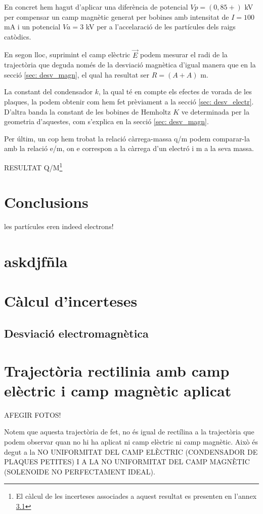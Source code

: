 \documentclass[11pt]{article}
\begin{document}
En concret hem hagut d'aplicar una diferència de potencial $Vp = (0,85 + )$ kV per compensar un camp magnètic generat per bobines amb intensitat de $I = 100$ mA i un potencial $Va = 3$ kV per a l'accelaració de les partícules dels raigs catòdics.

En segon lloc, suprimint el camp elèctric $\vec{E}$ podem mesurar el radi de la trajectòria que deguda només de la desviació magnètica d'igual manera que en la secció \ref{sec: desv_magn}, el qual ha resultat ser $R = (A + A)$ m.

La constant del condensador $k$, la qual té en compte els efectes de vorada de les plaques, la podem obtenir com hem fet prèviament a la secció \ref{sec: desv_electr}. D'altra banda la constant de les bobines de Hemholtz $K$ ve determinada per la geometria d'aquestes, com s'explica en la secció \ref{sec: desv_magn}.

Per últim, un cop hem trobat la relació càrrega-massa q/m podem comparar-la amb la relació e/m, on e correspon a la càrrega d'un electró i m a la seva massa.

RESULTAT Q/M\footnote{El càlcul de les incerteses associades a aquest resultat es presenten en l'annex \ref{sec: inc_desv_em}}

\section{Conclusions}
les partícules eren indeed electrons!

\section{askdjfñla}

\section{Càlcul d'incerteses}\label{sec: incerteses}
\subsection{Desviació electromagnètica}\label{sec: inc_desv_em}

\section{Trajectòria rectilinia amb camp elèctric i camp magnètic aplicat}\label{sec: traj_no_rect}

AFEGIR FOTOS!

Notem que aquesta trajectòria de fet, no és igual de rectílina a la trajectòria que podem observar quan no hi ha aplicat ni camp elèctric ni camp magnètic. Això és degut a la NO UNIFORMITAT DEL CAMP ELÈCTRIC (CONDENSADOR DE PLAQUES PETITES) I A LA NO UNIFORMITAT DEL CAMP MAGNÈTIC (SOLENOIDE NO PERFECTAMENT IDEAL).
\end{document}
